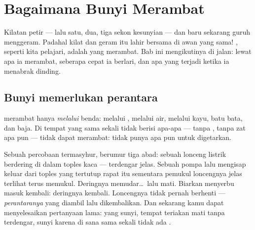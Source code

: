\chapter{Bagaimana Bunyi Merambat}\label{ch:g4:how-sound-travels}

Kilatan petir --- lalu satu, dua, tiga sekon kesunyian --- dan baru
sekarang guruh menggeram. Padahal kilat dan geram itu lahir bersama di
awan yang sama! , seperti kita pelajari, adalah  yang
merambat. Bab ini mengikutinya di jalan: lewat apa ia merambat,
seberapa cepat ia berlari, dan apa yang terjadi ketika ia menabrak
dinding.

\section{Bunyi memerlukan perantara}

\begin{proposition}\label{prop:g4:how-sound-travels:carrier}
 merambat hanya \emph{melalui} benda: melalui , melalui air,
melalui kayu, batu bata, dan baja. Di tempat yang sama sekali tidak
berisi apa-apa --- tanpa , tanpa zat apa pun ---  tidak
dapat merambat:  tidak punya apa pun untuk digetarkan.
\end{proposition}

\begin{example}\label{ex:g4:how-sound-travels:jar}
Sebuah percobaan termasyhur, berumur tiga abad: sebuah lonceng listrik
berdering di dalam toples kaca --- terdengar jelas. Sebuah pompa lalu
mengisap  keluar dari toples yang tertutup rapat itu sementara
pemukul loncengnya jelas terlihat terus memukul. Deringnya
memudar\dots\ lalu mati. Biarkan  menyerbu masuk kembali:
deringnya kembali. Loncengnya tidak pernah berhenti ---
\emph{perantaranya} yang diambil lalu dikembalikan. Dan sekarang kamu
dapat menyelesaikan pertanyaan lama:  yang sunyi, tempat teriakan
mati tanpa terdengar, sunyi karena di sana sama sekali tidak ada
.
\end{example}

